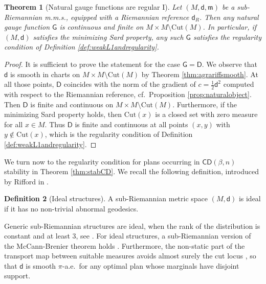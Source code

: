 \documentclass[11pt,a4paper]{article}
\theoremstyle{plain}
\newtheorem{theorem}{Theorem}[section]
\theoremstyle{definition}
\newtheorem{definition}[theorem]{Definition}
\theoremstyle{remark}
\numberwithin{equation}{section}
\newcommand{\Cut}{\mathrm{Cut}}
\newcommand{\CD}{\mathsf{CD}}
\newcommand{\mm}{\mathfrak m}
\newcommand{\sfd}{\mathsf d}
\newcommand{\sfD}{\mathsf D}
\newcommand{\sfG}{\mathsf G}
\begin{document}
\begin{theorem}[Natural gauge functions are regular I]\label{t:regularityforstabilityMCP}
Let $(M,\sfd,\mm)$ be a sub-Rieman\-nian m.m.s., equipped with a Riemannian reference $\sfd_R$. Then any natural gauge function $\sfG$ is continuous and finite on $M\times M \setminus \Cut(M)$. In particular, if $(M,\sfd)$ satisfies the minimizing Sard property, any such $\sfG$ satisfies the regularity condition of Definition \ref{def:weakL1andregularity}.
\end{theorem}
\begin{proof}
It is sufficient to prove the statement for the case $\sfG = \sfD$. We observe that $\sfd$ is smooth in charts on $M\times M \setminus \Cut(M)$ by Theorem \ref{thm:agrariffsmooth}. At all those points, $\sfD$ coincides with the norm of the gradient of $c=\frac{1}{2}\sfd^2$ computed with respect to the Riemannian reference, cf.\ Proposition \ref{prop:naturalobject}. Then $\sfD$ is finite and continuous on $M\times M \setminus \Cut(M)$. Furthermore, if the minimizing Sard property holds, then $\Cut(x)$ is a closed set with zero measure for all $x\in M$. Thus $\sfD$ is finite and continuous at all points $(x,y)$ with $y\notin \Cut(x)$, which is the regularity condition of Definition \ref{def:weakL1andregularity}.
\end{proof}

We turn now to the regularity condition for plans occurring in $\CD(\beta,n)$ stability in Theorem \ref{thm:stabCD}. We recall the following definition, introduced by Rifford in \cite{RiffordCarnot,riffordbook}.

\begin{definition}[Ideal structures]\label{def:ideal}
A sub-Riemannian metric space $(M,\sfd)$ is ideal if it has no non-trivial abnormal geodesics.
\end{definition}

Generic sub-Riemannian structures are ideal, when the rank of the distribution is constant and at least 3, see \cite[Thm.\@ 2.8]{CJT-Genericity}. For ideal structures, a sub-Riemannian version of the McCann-Brenier theorem holds \cite{FR-mass,riffordbook}. Furthermore, the non-static part of the transport map between suitable measures avoids almost surely the cut locus \cite{BRInv}, so that $\sfd$ is smooth $\pi$-a.e.\ for any optimal plan whose marginals have disjoint support.
\end{document}
